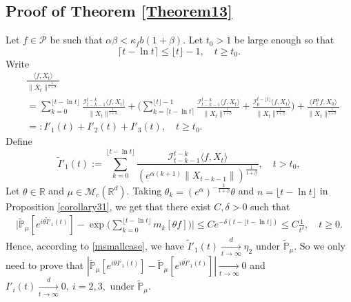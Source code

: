 \documentclass[12pt,a4paper]{amsart}
\theoremstyle{plain}
\theoremstyle{definition}
\numberwithin{equation}{section}
\begin{document}
\subsection{Proof of Theorem \ref{Theorem13}}
	Let $f\in \mathcal P$ be such that $\alpha \beta < \kappa_f b(1+\beta)$.
	Let $t_0 > 1$ be large enough so that
\[
	\lceil t - \ln t\rceil
	\leq \lfloor t \rfloor - 1,
	\quad t\geq t_0.
\]
	Write
\begin{align*}
	&\frac{\langle f,X_t\rangle}{\|X_t\|^{\frac{1}{1+\beta}}}
	\\&=\sum_{k=0}^{\lfloor t-\ln t \rfloor} \frac{\mathcal I_{t-k-1}^{t-k}\langle f ,X_t\rangle}{\|X_t\|^{\frac{1}{1+\beta}}}+ \Big(\sum_{k=\lceil t-\ln t \rceil}^{\lfloor t \rfloor-1} \frac{\mathcal I_{t-k-1}^{t-k}\langle f ,X_t\rangle}{\|X_t\|^{\frac{1}{1+\beta}}}+\frac{\mathcal I_0^{t-\lfloor t \rfloor}\langle f ,X_t\rangle}{\|X_t\|^{\frac{1}{1+\beta}}}\Big) + 
\frac{\langle P^\alpha_t f, X_0\rangle}{\|X_t\|^{\frac{1}{1+\beta}}}
	\\&=:I'_1(t)+I'_2(t)+I'_3(t),
	\quad t\geq t_0.
\end{align*}
	Define
 \[
 	\tilde I'_1(t)
 	:=\sum_{k=0}^{\lfloor t-\ln t \rfloor}\frac{\mathcal I_{t-k-1}^{t-k}\langle f ,X_t\rangle}{( e^{\alpha(k+1)}\|X_{t-k-1}\|)^{\frac{1}{1+\beta}}},
 	\quad t > t_0,
 \]
    Let $\theta\in \mathbb R$ and $\mu\in \mathcal M_c(\mathbb R^d)$.
    Taking $\theta_k=(e^{\alpha})^{-\frac{1}{1+\beta}} \theta $ and $n={\lfloor t-\ln t \rfloor}$ in Proposition \ref{corollary31},
    we get that there exist $C,\delta > 0$ such that
\begin{align*}
    \Big|\mathbb{\tilde{P}}_{\mu} [e^{i\theta\tilde I'_1(t)} ]-\exp\Big(\sum_{k=0}^{\lfloor t-\ln t \rfloor}m_k[\theta f]\Big)\Big|
    \leq C e^{-\delta(t - \lfloor t - \ln t\rfloor)}
    \leq C \frac{1}{t^{\delta}},
    \quad t\geq 0.
\end{align*}
    Hence, according to \eqref{msmallcase}, we have $\tilde I'_1(t)\xrightarrow[t\to \infty]{d} \eta_2$ under $\tilde {\mathbb P}_\mu$.
    So we only need to prove that $|\mathbb{\tilde{P}}_{\mu}[e^{i\theta I'_1(t)}]-\mathbb{\tilde{P}}_{\mu}[e^{i\theta\tilde I'_1(t)}]|\xrightarrow[t\to \infty]{} 0$ and $I'_i(t)\xrightarrow[t\to \infty]{d} 0,~i=2,3,$ under $\tilde {\mathbb P}_\mu$.
\end{document}
